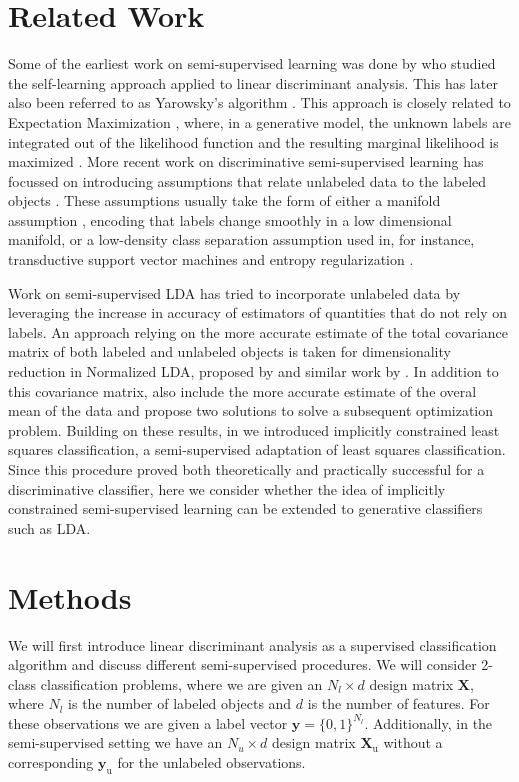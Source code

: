\documentclass[twoside]{memoir}\usepackage[]{graphicx}\usepackage{xcolor}
\renewcommand{\cite}{\citep}
\begin{document}
\section{Related Work}
Some of the earliest work on semi-supervised learning was done by \cite{McLachlan1975,McLachlan1977} who studied the self-learning approach applied to linear discriminant analysis. This has later also been referred to as Yarowsky's algorithm \cite{Yarowsky1995}. This approach is closely related to Expectation Maximization \cite{Abney2004}, where, in a generative model, the unknown labels are integrated out of the likelihood function and the resulting marginal likelihood is maximized \cite{Dempster1977}. More recent work on discriminative semi-supervised learning has focussed on introducing assumptions that relate unlabeled data to the labeled objects \cite{Chapelle2006}. These assumptions usually take the form of either a manifold assumption \cite{Zhu2003}, encoding that labels change smoothly in a low dimensional manifold, or a low-density class separation assumption used in, for instance, transductive support vector machines \cite{Bennett1998,Joachims1999} and entropy regularization \cite{Grandvalet2005}. 

Work on semi-supervised LDA has tried to incorporate unlabeled data by leveraging the increase in accuracy of estimators of quantities that do not rely on labels. An approach relying on the more accurate estimate of the total covariance matrix of both labeled and unlabeled objects is taken for dimensionality reduction in Normalized LDA, proposed by \cite{Fan2008} and similar work by \cite{Cai2007}. In addition to this covariance matrix, \cite{Loog2014a} also include the more accurate estimate of the overal mean of the data and propose two solutions to solve a subsequent optimization problem. Building on these results, in \cite{Krijthe2015} we introduced implicitly constrained least squares classification, a semi-supervised adaptation of least squares classification. Since this procedure proved both theoretically and practically successful for a discriminative classifier, here we consider whether the idea of implicitly constrained semi-supervised learning can be extended to generative classifiers such as LDA.

\section{Methods}
We will first introduce linear discriminant analysis as a supervised classification algorithm and discuss different semi-supervised procedures. We will consider 2-class classification problems, where we are given an $N_l \times d$ design matrix $\mathbf{X}$, where $N_l$ is the number of labeled objects and $d$ is the number of features. For these observations we are given a label vector $\mathbf{y}=\{0,1\}^{N_l}$. Additionally, in the semi-supervised setting we have an $N_u \times d$ design matrix $\mathbf{X}_\textrm{u}$ without a corresponding $\mathbf{y}_\textrm{u}$ for the unlabeled observations.
\end{document}
